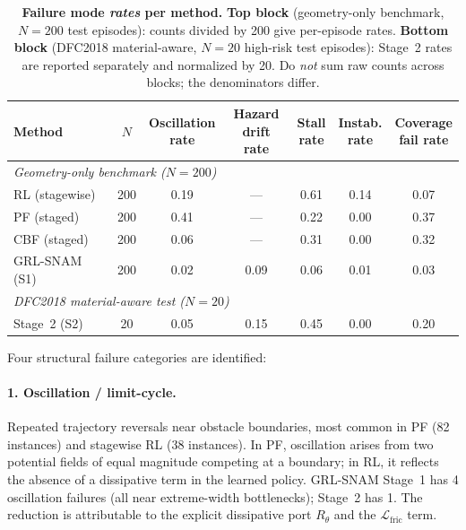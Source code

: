 \begin{table}[t]
\centering
\caption{%
  \textbf{Failure mode \emph{rates} per method.}
  \textbf{Top block} (geometry-only benchmark, $N{=}200$ test episodes):
  counts divided by 200 give per-episode rates.
  \textbf{Bottom block} (DFC2018 material-aware, $N{=}20$ high-risk test
  episodes): Stage~2 rates are reported separately and normalized by 20.
  Do \emph{not} sum raw counts across blocks; the denominators differ.
}
\label{tab:ch6:failures}
\small
\setlength{\tabcolsep}{4pt}
\renewcommand{\arraystretch}{1.3}
\begin{tabular}{lcccccc}
\toprule
\textbf{Method} & $N$ &
\makecell{\textbf{Oscillation}\\\textbf{rate}} &
\makecell{\textbf{Hazard}\\\textbf{drift rate}} &
\makecell{\textbf{Stall}\\\textbf{rate}} &
\makecell{\textbf{Instab.}\\\textbf{rate}} &
\makecell{\textbf{Coverage}\\\textbf{fail rate}} \\
\midrule
\multicolumn{7}{l}{\textit{Geometry-only benchmark ($N=200$)}} \\
RL (stagewise) & 200 & 0.19 & — & 0.61 & 0.14 & 0.07 \\
PF (staged)    & 200 & 0.41 & — & 0.22 & 0.00 & 0.37 \\
CBF (staged)   & 200 & 0.06 & — & 0.31 & 0.00 & 0.32 \\
GRL-SNAM (S1)  & 200 & 0.02 & 0.09 & 0.06 & 0.01 & 0.03 \\
\midrule
\multicolumn{7}{l}{\textit{DFC2018 material-aware test ($N=20$)}} \\
Stage~2 (S2)   &  20 & 0.05 & 0.15 & 0.45 & 0.00 & 0.20 \\
\bottomrule
\end{tabular}
\end{table}

Four structural failure categories are identified:

\paragraph{1. Oscillation / limit-cycle.}
Repeated trajectory reversals near obstacle boundaries, most common
in PF (82 instances) and stagewise RL (38 instances).
In PF, oscillation arises from two potential fields of equal magnitude
competing at a boundary; in RL, it reflects the absence of a dissipative
term in the learned policy.
GRL-SNAM Stage~1 has 4 oscillation failures (all near extreme-width
bottlenecks); Stage~2 has 1.
The reduction is attributable to the explicit dissipative port $R_\theta$
and the $\mathcal{L}_{\mathrm{fric}}$ term.

